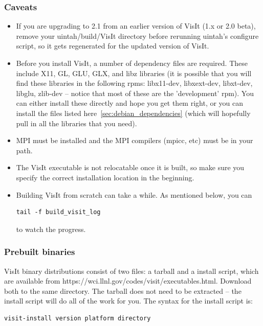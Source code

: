 \documentclass[12pt]{article}
\begin{document}
\subsubsection{Caveats}
\label{subsec:VisIt_Caveats}
\begin{itemize}
\item If you are upgrading to 2.1 from an earlier version of VisIt
  (1.x or 2.0 beta), remove your uintah/build/VisIt directory before
  rerunning uintah's configure script, so it gets regenerated for the
  updated version of VisIt.
\item Before you install VisIt, a number of dependency files are
  required.  These include X11, GL, GLU, GLX, and libz libraries (it
  is possible that you will find these libraries in the following
  rpms: libx11-dev, libxext-dev, libxt-dev, libglu, zlib-dev -- notice
  that most of these are the 'development' rpm).  You can either
  install these directly and hope you get them right, or you can
  install the files listed here~\ref{sec:debian_dependencies} (which
  will hopefully pull in all the libraries that you need).
\item MPI must be installed and the MPI compilers (mpicc, etc) must be
  in your path.
\item The VisIt executable is not relocatable once it is built, so
  make sure you specify the correct installation location in the
  beginning.
\item Building VisIt from scratch can take a while.  As mentioned
  below, you can \begin{verbatim}tail -f build_visit_log\end{verbatim}
  to watch the progress.

\end{itemize}

\subsubsection{Prebuilt binaries}
\label{subsec:PrebuiltBinaries}

VisIt binary distributions consist of two files: a tarball and a
install script, which are available from
https://wci.llnl.gov/codes/visit/executables.html.  Download both to
the same directory.  The tarball does not need to be extracted -- the
install script will do all of the work for you.  The syntax for the
install script is:
\begin{verbatim}
visit-install version platform directory
\end{verbatim}
\end{document}
